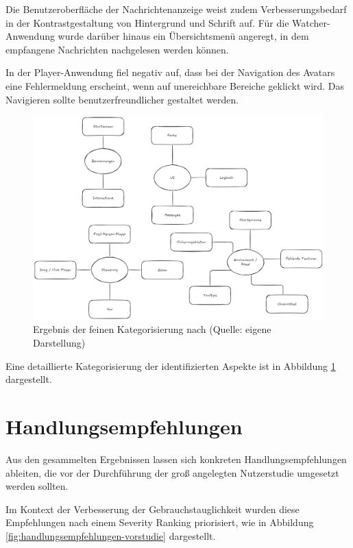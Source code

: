 Die Benutzeroberfläche der Nachrichtenanzeige weist zudem Verbesserungsbedarf in der Kontrastgestaltung von Hintergrund und Schrift auf. Für die Watcher-Anwendung wurde darüber hinaus ein Übersichtsmenü angeregt, in dem empfangene Nachrichten nachgelesen werden können.

In der Player-Anwendung fiel negativ auf, dass bei der Navigation des Avatars eine Fehlermeldung erscheint, wenn auf unereichbare Bereiche geklickt wird. Das Navigieren sollte benutzerfreundlicher gestaltet werden.

\begin{figure}[ht]
\centering
\includegraphics[width=1\linewidth]{content/pictures/Prestudy-Qualitative-Auswertung-Schritt-2.png}
\caption{Ergebnis der feinen Kategorisierung nach \cite{braun_using_2006} (Quelle: eigene Darstellung)}
\label{fig:pre-study-qualitative-findings_2}
\end{figure}

Eine detaillierte Kategorisierung der identifizierten Aspekte ist in Abbildung \ref{fig:pre-study-qualitative-findings_2} dargestellt.

\section{Handlungsempfehlungen}

Aus den gesammelten Ergebnissen lassen sich konkreten Handlungsempfehlungen ableiten, die vor der Durchführung der groß angelegten Nutzerstudie umgesetzt werden sollten.

Im Kontext der Verbesserung der Gebrauchstauglichkeit wurden diese Empfehlungen nach einem Severity Ranking priorisiert, wie in Abbildung \ref{fig:handlungsempfehlungen-vorstudie} dargestellt.

